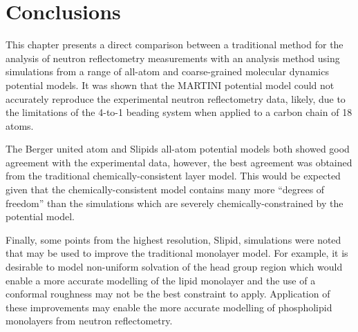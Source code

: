 \section{Conclusions}

This chapter presents a direct comparison between a traditional method for the analysis of neutron reflectometry measurements with an analysis method using simulations from a range of all-atom and coarse-grained molecular dynamics potential models.
It was shown that the MARTINI potential model could not accurately reproduce the experimental neutron reflectometry data, likely, due to the limitations of the 4-to-1 beading system when applied to a carbon chain of 18 atoms.

The Berger united atom and Slipids all-atom potential models both showed good agreement with the experimental data, however, the best agreement was obtained from the traditional chemically-consistent layer model.
This would be expected given that the chemically-consistent model contains many more ``degrees of freedom'' than the simulations which are severely chemically-constrained by the potential model.

Finally, some points from the highest resolution, Slipid, simulations were noted that may be used to improve the traditional monolayer model.
For example, it is desirable to model non-uniform solvation of the head group region which would enable a more accurate modelling of the lipid monolayer and the use of a conformal roughness may not be the best constraint to apply.
Application of these improvements may enable the more accurate modelling of phospholipid monolayers from neutron reflectometry.
